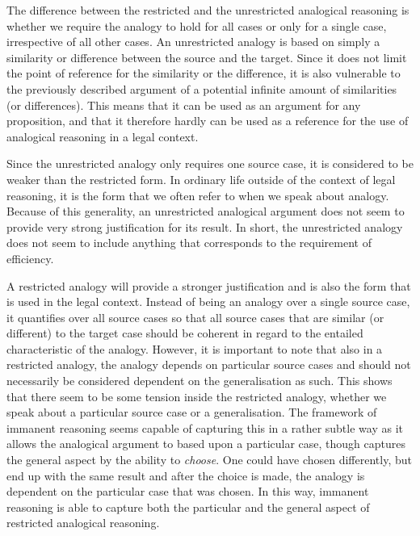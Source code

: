 		 The difference between the restricted and the unrestricted analogical reasoning is whether we require the analogy to hold for all cases or only for a single case, irrespective of all other cases. An unrestricted analogy is based on simply a similarity or difference between the source and the target. Since it does not limit the point of reference for the similarity or the difference, it is also vulnerable to the previously described argument of a potential infinite amount of similarities (or differences). This means that it can be used as an argument for any proposition, and that it therefore hardly can be used as a reference for the use of analogical reasoning in a legal context. 
		 
		 Since the unrestricted analogy only requires one source case, it is considered to be weaker than the restricted form. In ordinary life outside of the context of legal reasoning, it is the form that we often refer to when we speak about analogy. Because of this generality, an unrestricted analogical argument does not seem to provide very strong justification for its result. In short, the unrestricted analogy does not seem to include anything that corresponds to the requirement of efficiency. 
		 
		 A restricted analogy will provide a stronger justification and is also the form that is used in the legal context. Instead of being an analogy over a single source case, it quantifies over all source cases so that all source cases that are similar (or different) to the target case should be coherent in regard to the entailed characteristic of the analogy. However, it is important to note that also in a restricted analogy, the analogy depends on particular source cases and should not necessarily be considered dependent on the generalisation as such. This shows that there seem to be some tension inside the restricted analogy, whether we speak about a particular source case or a generalisation. The framework of immanent reasoning seems capable of capturing this in a rather subtle way as it allows the analogical argument to based upon a particular case, though captures the general aspect by the ability to \textit{choose}. One could have chosen differently, but end up with the same result and after the choice is made, the analogy is dependent on the particular case that was chosen. In this way, immanent reasoning is able to capture both the particular and the general aspect of restricted analogical reasoning. 
		
